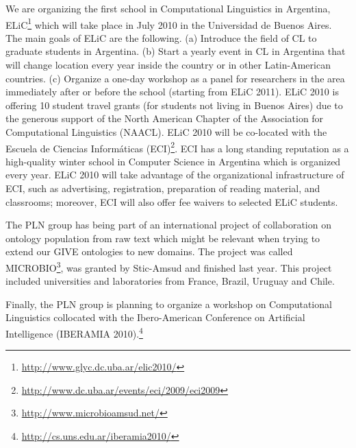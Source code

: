 We are organizing the first school in Computational Linguistics in
Argentina, ELiC\footnote{\url{http://www.glyc.dc.uba.ar/elic2010/}} which will
take place in July 2010 in the Universidad de Buenos Aires. The main goals of
ELiC are the following. (a) Introduce the field of CL to graduate students in
Argentina. (b) Start a yearly event in CL in Argentina that will change
location every year inside the country or in other Latin-American countries.
(c) Organize a one-day workshop as a panel for researchers in the area
immediately after or before the school (starting from ELiC 2011). ELiC 2010 is
offering 10 student travel grants (for students not living in Buenos Aires)
due to the generous support of the North American Chapter of the Association for
Computational Linguistics (NAACL). ELiC 2010 will be co-located with the Escuela
de Ciencias Inform\'aticas
(ECI)\footnote{\url{http://www.dc.uba.ar/events/eci/2009/eci2009}}. ECI has a
long standing reputation as a high-quality winter school in Computer Science in
Argentina which is organized every year. ELiC 2010 will take advantage of the
organizational infrastructure of ECI, such as advertising, registration,
preparation of reading material, and classrooms; moreover, ECI will also offer
fee waivers to selected ELiC students.

The PLN group has being part of an international project of collaboration on
ontology population from raw text which might be relevant when trying to extend
our GIVE ontologies to new domains. The project was called 
MICROBIO\footnote{\url{http://www.microbioamsud.net/}}, was granted by
Stic-Amsud and finished last year. This project included universities and
laboratories from France, Brazil, Uruguay and Chile. 

Finally, the PLN group is planning to organize a workshop on Computational
Linguistics collocated with the Ibero-American Conference on Artificial
Intelligence (IBERAMIA
2010).\footnote{\url{http://cs.uns.edu.ar/iberamia2010/}} 

